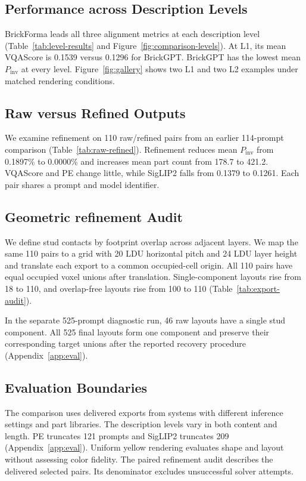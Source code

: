 \documentclass[letterpaper]{article} %
\begin{document}
\subsection{Performance across Description Levels}

BrickForma leads all three alignment metrics at each description level (Table~\ref{tab:level-results} and Figure~\ref{fig:comparison-levels}). At L1, its mean VQAScore is 0.1539 versus 0.1296 for BrickGPT. BrickGPT has the lowest mean $P_{\mathrm{inv}}$ at every level. Figure~\ref{fig:gallery} shows two L1 and two L2 examples under matched rendering conditions.



\subsection{Raw versus Refined Outputs}

We examine refinement on 110 raw/refined pairs from an earlier 114-prompt comparison (Table~\ref{tab:raw-refined}). Refinement reduces mean $P_{\mathrm{inv}}$ from 0.1897\% to 0.0000\% and increases mean part count from 178.7 to 421.2. VQAScore and PE change little, while SigLIP2 falls from 0.1379 to 0.1261. Each pair shares a prompt and model identifier.

\subsection{Geometric refinement Audit}
\label{sec:diagnostics}
We define stud contacts by footprint overlap across adjacent layers. We map the same 110 pairs to a grid with 20 LDU horizontal pitch and 24 LDU layer height and translate each export to a common occupied-cell origin. All 110 pairs have equal occupied voxel unions after translation. Single-component layouts rise from 18 to 110, and overlap-free layouts rise from 100 to 110 (Table~\ref{tab:export-audit}).


In the separate 525-prompt diagnostic run, 46 raw layouts have a single stud component. All 525 final layouts form one component and preserve their corresponding target unions after the reported recovery procedure (Appendix~\ref{app:eval}).

\subsection{Evaluation Boundaries}
The comparison uses delivered exports from systems with different inference settings and part libraries. The description levels vary in both content and length. PE truncates 121 prompts and SigLIP2 truncates 209 (Appendix~\ref{app:eval}). Uniform yellow rendering evaluates shape and layout without assessing color fidelity. The paired refinement audit describes the delivered selected pairs. Its denominator excludes unsuccessful solver attempts.
\end{document}
